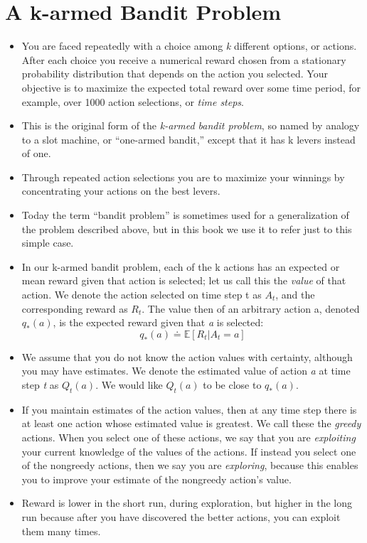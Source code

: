 \documentclass{article}
\begin{document}
\section{A k-armed Bandit Problem}
\begin{itemize}
    \item You are faced repeatedly with a choice among \emph{k} different options, or actions. After each choice you receive a numerical reward chosen from a stationary probability distribution that depends on the action you selected. Your objective is to maximize the expected total reward over some time period, for example, over 1000 action selections, or \emph{time steps}.
    \item This is the original form of the \emph{k-armed bandit problem}, so named by analogy to a slot machine, or “one-armed bandit,” except that it has k levers instead of one.
    \item Through repeated action selections you are to maximize your winnings by concentrating your actions on the best levers.
    \item Today the term “bandit problem” is sometimes used for a generalization of the problem described above, but in this book we use it to refer just to this simple case.
    \item In our k-armed bandit problem, each of the k actions has an expected or mean reward given that action is selected; let us call this the \emph{value} of that action. We denote the action selected on time step t as $A_t$, and the corresponding reward as $R_t$. The value then of an arbitrary action a, denoted $q_*(a)$, is the expected reward given that \emph{a} is selected: $$ q_*(a) \doteq \mathds{E}[R_t | A_t = a] $$
    \item We assume that you do not know the action values with certainty, although you may have estimates. We denote the estimated value of action \emph{a} at time step \emph{t} as $Q_t(a)$. We would like $Q_t(a)$ to be close to $q_*(a)$.
    \item If you maintain estimates of the action values, then at any time step there is at least one action whose estimated value is greatest. We call these the \emph{greedy} actions. When you select one of these actions, we say that you are \emph{exploiting} your current knowledge of the values of the actions. If instead you select one of the nongreedy actions, then we say you are \emph{exploring}, because this enables you to improve your estimate of the nongreedy action's value.
    \item Reward is lower in the short run, during exploration, but higher in the long run because after you have discovered the better actions, you can exploit them many times.
\end{itemize}
\end{document}
